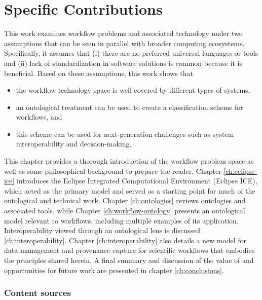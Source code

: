 \section{Specific Contributions}

This work examines workflow problems and associated technology under two
assumptions that can be seen in parallel with broader
computing ecosystems. Specifically, it assumes that (i) there are no preferred
universal languages or tools and (ii) lack of standardization
in software solutions is common because it is beneficial. Based
on these assumptions, this work shows that 
\begin{itemize}
  \item the workflow technology space is well covered by different types
  of systems,
  \item an ontological treatment can be used to create a classification scheme
  for workflows, and
  \item this scheme can be used for next-generation challenges such as system
  interoperability and decision-making.
\end{itemize}

This chapter provides a thorough introduction of the workflow problem space as
well as some philosophical background to prepare the reader. Chapter
\ref{ch:eclipse-ice} introduces the Eclipse Integrated Computational Environment
(Eclipse ICE), which acted as the primary model and served as a starting point
for much of the ontological and technical work. Chapter \ref{ch:ontologies}
reviews ontologies and associated tools, while Chapter
\ref{ch:workflow-ontology} presents an ontological model relevant to workflows,
including multiple examples of its application. Interoperability viewed through
an ontological lens is discussed \ref{ch:interoperability}. Chapter
\ref{ch:interoperability} also details a new model for data management and provenance
capture for scientific workflows that embodies the principles shared herein. A
final summary and discussion of the value of and opportunities for future work
are presented in chapter \ref{ch:conclusions}.

\subsubsection{Content sources}

